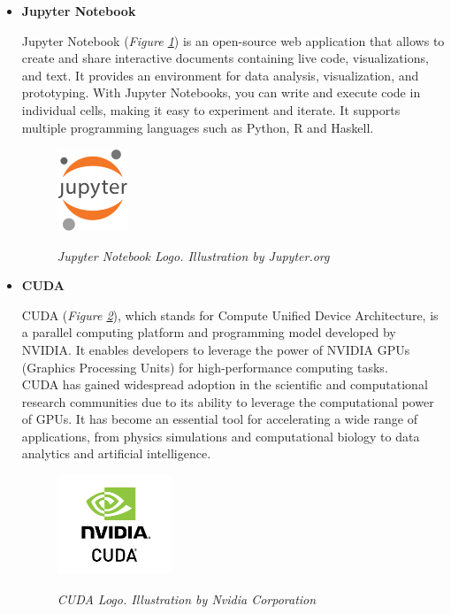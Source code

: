 \begin{itemize}
\item \textbf{Jupyter Notebook}

Jupyter Notebook (\textit{Figure \ref{fig:jupyter-logo}}) is an open-source web application that allows to create and share interactive documents containing live code, visualizations, and text. It provides an environment for data analysis, visualization, and prototyping. With Jupyter Notebooks, you can write and execute code in individual cells, making it easy to experiment and iterate. It supports multiple programming languages such as Python, R and Haskell.

\begin{figure}[H]
\centering
\includegraphics[width=0.2\textwidth]{imatges/studies_and_decisions/jupyter-notebook.png}
\caption[Jupyter Notebook Logo]{\textit{Jupyter Notebook Logo. Illustration by Jupyter.org}}
{\label{fig:jupyter-logo}}
\end{figure}

\newpage

\item \textbf{CUDA}

CUDA (\textit{Figure \ref{fig:cuda-logo}}), which stands for Compute Unified Device Architecture, is a parallel computing platform and programming model developed by NVIDIA. It enables developers to leverage the power of NVIDIA GPUs (Graphics Processing Units) for high-performance computing tasks. \\

CUDA has gained widespread adoption in the scientific and computational research communities due to its ability to leverage the computational power of GPUs. It has become an essential tool for accelerating a wide range of applications, from physics simulations and computational biology to data analytics and artificial intelligence.

\begin{figure}[H]
\centering
\begin{adjustbox}{trim=0cm 0.25cm 0cm 0.5cm, clip}
\includegraphics[width=0.325\textwidth]{imatges/studies_and_decisions/nvidia-cuda.jpg}
\end{adjustbox}
\caption[CUDA Logo]{\textit{CUDA Logo. Illustration by Nvidia Corporation}}
{\label{fig:cuda-logo}}
\end{figure}


\end{itemize}
